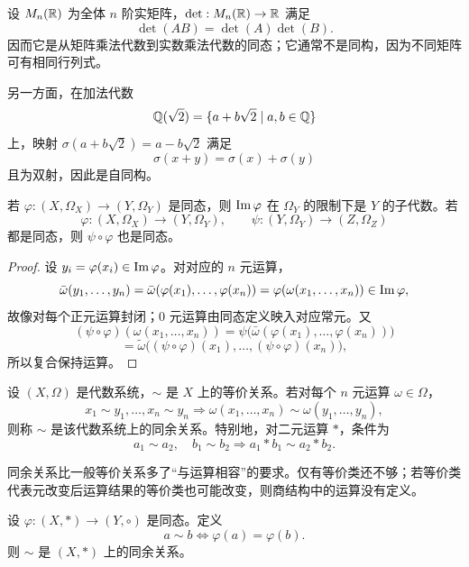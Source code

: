 \begin{example}[title={行列式同态与自同构}]\label{determinant-auto}
  设 $M_n(\mathbb{R})$ 为全体 $n$ 阶实矩阵，$\det:M_n(\mathbb{R})\to\mathbb{R}$ 满足
  \[
  \det(AB)=\det(A)\det(B).
  \]
  因而它是从矩阵乘法代数到实数乘法代数的同态；它通常不是同构，因为不同矩阵可有相同行列式。

  另一方面，在加法代数
  \[
  \mathbb{Q}(\sqrt2)=\{a+b\sqrt2\mid a,b\in\mathbb{Q}\}
  \]
  上，映射 $\sigma(a+b\sqrt2)=a-b\sqrt2$ 满足
  \[
  \sigma(x+y)=\sigma(x)+\sigma(y)
  \]
  且为双射，因此是自同构。
\end{example}

\begin{theorem}[同态像与同态复合]\label{hom-image-composition}
  若 $\varphi:(X,\Omega_X)\to(Y,\Omega_Y)$ 是同态，则 $\operatorname{Im}\varphi$ 在
  $\Omega_Y$ 的限制下是 $Y$ 的子代数。若
  \[
  \varphi:(X,\Omega_X)\to(Y,\Omega_Y),\qquad
  \psi:(Y,\Omega_Y)\to(Z,\Omega_Z)
  \]
  都是同态，则 $\psi\circ\varphi$ 也是同态。
\end{theorem}

\begin{proof}
  设 $y_i=\varphi(x_i)\in\operatorname{Im}\varphi$。对对应的 $n$ 元运算，
  \[
  \bar\omega(y_1,\ldots,y_n)
  =\bar\omega(\varphi(x_1),\ldots,\varphi(x_n))
  =\varphi(\omega(x_1,\ldots,x_n))\in\operatorname{Im}\varphi,
  \]
  故像对每个正元运算封闭；$0$ 元运算由同态定义映入对应常元。又
  \[
  (\psi\circ\varphi)(\omega(x_1,\ldots,x_n))
  =\psi\bigl(\bar\omega(\varphi(x_1),\ldots,\varphi(x_n))\bigr)
  \]
  \[
  =\widetilde\omega\bigl((\psi\circ\varphi)(x_1),\ldots,
  (\psi\circ\varphi)(x_n)\bigr),
  \]
  所以复合保持运算。
\end{proof}

\begin{definition}[同余关系]\label{congruence}
  设 $(X,\Omega)$ 是代数系统，$\sim$ 是 $X$ 上的等价关系。若对每个
  $n$ 元运算 $\omega\in\Omega$，
  \[
  x_1\sim y_1,\ldots,x_n\sim y_n
  \Longrightarrow
  \omega(x_1,\ldots,x_n)\sim\omega(y_1,\ldots,y_n),
  \]
  则称 $\sim$ 是该代数系统上的同余关系。特别地，对二元运算 $*$，条件为
  \[
  a_1\sim a_2,\quad b_1\sim b_2
  \Longrightarrow a_1*b_1\sim a_2*b_2.
  \]
\end{definition}

同余关系比一般等价关系多了“与运算相容”的要求。仅有等价类还不够；若等价类代表元改变后运算结果的等价类也可能改变，则商结构中的运算没有定义。

\begin{theorem}[同态诱导同余]\label{hom-induces-congruence}
  设 $\varphi:(X,*)\to(Y,\circ)$ 是同态。定义
  \[
  a\sim b\Longleftrightarrow \varphi(a)=\varphi(b).
  \]
  则 $\sim$ 是 $(X,*)$ 上的同余关系。
\end{theorem}

